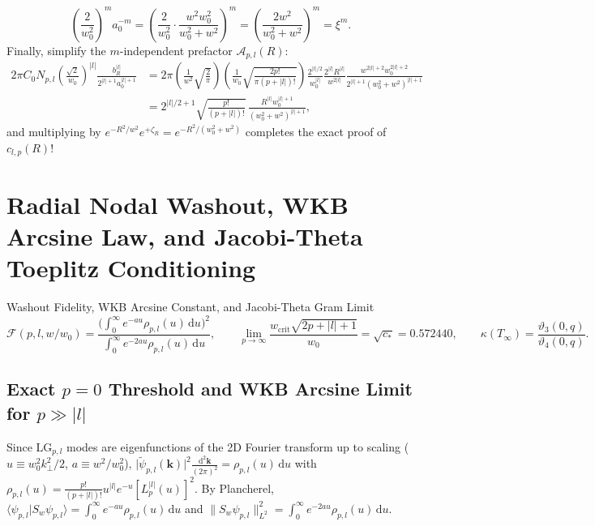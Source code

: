 \documentclass[10pt,letterpaper]{article}
\newcommand{\braket}[2]{\langle #1 | #2 \rangle}
\newcommand{\norm}[1]{\lVert #1 \rVert}
\newcommand{\abs}[1]{\lvert #1 \rvert}
\newcommand{\dd}{\mathrm{d}}
\numberwithin{equation}{section}
\begin{document}
\begin{equation}
  \left(\frac{2}{w_0^2}\right)^m a_0^{-m} = \left(\frac{2}{w_0^2}\cdot\frac{w^2 w_0^2}{w_0^2+w^2}\right)^m = \left(\frac{2w^2}{w_0^2+w^2}\right)^m = \xi^m.
\end{equation}
Finally, simplify the $m$-independent prefactor $\mathcal{A}_{p,l}(R)$:
\begin{align}
  2\pi C_0 N_{p,l}\left(\frac{\sqrt{2}}{w_0}\right)^{\abs{l}} \frac{b_R^{\abs{l}}}{2^{\abs{l}+1} a_0^{\abs{l}+1}}
  &= 2\pi\left(\frac{1}{w^2}\sqrt{\frac{2}{\pi}}\right)\left(\frac{1}{w_0}\sqrt{\frac{2p!}{\pi(p+\abs{l})!}}\right) \frac{2^{\abs{l}/2}}{w_0^{\abs{l}}} \frac{2^{\abs{l}} R^{\abs{l}}}{w^{2\abs{l}}} \frac{w^{2\abs{l}+2} w_0^{2\abs{l}+2}}{2^{\abs{l}+1}(w_0^2+w^2)^{\abs{l}+1}} \nonumber \\
  &= 2^{\abs{l}/2 + 1}\sqrt{\frac{p!}{(p+\abs{l})!}}\,\frac{R^{\abs{l}} w_0^{\abs{l}+1}}{(w_0^2+w^2)^{\abs{l}+1}},
\end{align}
and multiplying by $e^{-R^2/w^2} e^{+\zeta_R} = e^{-R^2/(w_0^2+w^2)}$ completes the exact proof of $c_{l,p}(R)$!

\section{Radial Nodal Washout, WKB Arcsine Law, and Jacobi-Theta Toeplitz Conditioning}
\label{sec:p1_rayleigh}

\begin{targeteq}{Washout Fidelity, WKB Arcsine Constant, and Jacobi-Theta Gram Limit}
\[
  \mathcal{F}(p,l,w/w_0) = \frac{\bigl(\int_0^\infty e^{-au}\rho_{p,l}(u)\,\dd u\bigr)^2}{\int_0^\infty e^{-2au}\rho_{p,l}(u)\,\dd u}, \qquad
  \lim_{p\to\infty} \frac{w_{\mathrm{crit}}\sqrt{2p+\abs{l}+1}}{w_0} = \sqrt{c_*} = 0.572440, \qquad
  \kappa(T_\infty) = \frac{\vartheta_3(0,q)}{\vartheta_4(0,q)}.
\]
\end{targeteq}

\subsection{Exact $p = 0$ Threshold and WKB Arcsine Limit for $p \gg \abs{l}$}
Since $\mathrm{LG}_{p,l}$ modes are eigenfunctions of the 2D Fourier transform up to scaling ($u \equiv w_0^2 k_\perp^2/2$, $a \equiv w^2/w_0^2$), $\abs{\widetilde{\psi}_{p,l}(\mathbf{k})}^2 \frac{\dd^2\mathbf{k}}{(2\pi)^2} = \rho_{p,l}(u)\,\dd u$ with $\rho_{p,l}(u) = \frac{p!}{(p+\abs{l})!} u^{\abs{l}} e^{-u} [L_p^{\abs{l}}(u)]^2$. By Plancherel, $\braket{\psi_{p,l}}{S_w\psi_{p,l}} = \int_0^\infty e^{-au}\rho_{p,l}(u)\,\dd u$ and $\norm{S_w\psi_{p,l}}_{L^2}^2 = \int_0^\infty e^{-2au}\rho_{p,l}(u)\,\dd u$.
\end{document}
